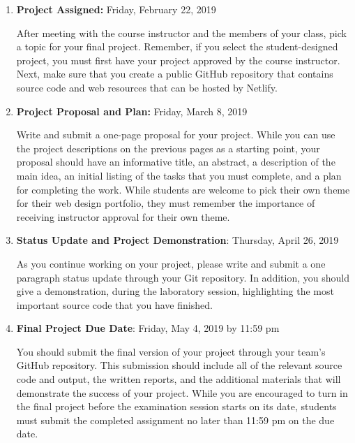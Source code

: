 \documentclass[11pt]{article}
\begin{document}
\begin{enumerate}

  \setlength{\itemsep}{0in}

  \item {\bf Project Assigned:} Friday, February 22, 2019

    After meeting with the course instructor and the members of your class, pick
    a topic for your final project. Remember, if you select the student-designed
    project, you must first have your project approved by the course instructor.
    Next, make sure that you create a public GitHub repository that contains
    source code and web resources that can be hosted by Netlify.

  \item {\bf Project Proposal and Plan:} Friday, March 8, 2019

    Write and submit a one-page proposal for your project. While you can use the
    project descriptions on the previous pages as a starting point, your
    proposal should have an informative title, an abstract, a description of the
    main idea, an initial listing of the tasks that you must complete, and a
    plan for completing the work. While students are welcome to pick their own
    theme for their web design portfolio, they must remember the importance of
    receiving instructor approval for their own theme.

  \item {\bf Status Update and Project Demonstration}: Thursday, April 26, 2019

    As you continue working on your project, please write and submit a one
    paragraph status update through your Git repository. In addition, you should
    give a demonstration, during the laboratory session, highlighting the most
    important source code that you have finished.

  \item {\bf Final Project Due Date}: Friday, May 4, 2019 by 11:59 pm

    You should submit the final version of your project through your team's
    GitHub repository. This submission should include all of the relevant source
    code and output, the written reports, and the additional materials that will
    demonstrate the success of your project. While you are encouraged to turn in
    the final project before the examination session starts on its date,
    students must submit the completed assignment no later than 11:59 pm on the
    due date.

\end{enumerate}
\end{document}
